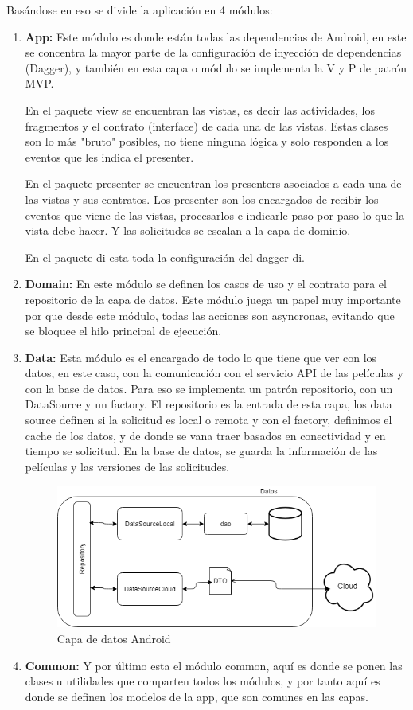 Basándose en eso se divide la aplicación en 4 módulos:
\begin{enumerate}

\item \textbf{ App:} Este módulo es donde están todas las dependencias de Android, en este se concentra la mayor parte de la configuración de inyección de dependencias (Dagger), y también en esta capa o módulo se implementa la V y P de patrón MVP.

En el paquete view se encuentran las vistas, es decir las actividades, los fragmentos y el contrato (interface) de cada una de las vistas. Estas clases son lo más "bruto" posibles, no tiene ninguna lógica y solo responden a los eventos que les indica el presenter.

En el paquete presenter se encuentran los presenters asociados a cada una de las vistas y sus contratos. Los presenter son los encargados de recibir los eventos que viene de las vistas, procesarlos e indicarle paso por paso lo que la vista debe hacer. Y las solicitudes se escalan a la capa de dominio.

En el paquete di esta toda la configuración del dagger di.
\item \textbf{ Domain:} En este módulo se definen los casos de uso y el contrato para el repositorio de la capa de datos. Este módulo juega un papel muy importante por que desde este módulo, todas las acciones son asyncronas, evitando que se bloquee el hilo principal de ejecución.
\item \textbf{ Data:} Esta módulo es el encargado de todo lo que tiene que ver con los datos, en este caso, con la comunicación con el servicio API de las películas y con la base de datos. Para eso se implementa un patrón repositorio, con un DataSource y un factory. El repositorio es la entrada de esta capa, los data source definen si la solicitud es local o remota y con el factory, definimos el cache de los datos, y de donde se vana traer basados en conectividad y en tiempo se solicitud. En la base de datos, se guarda la información de las películas y las versiones de las solicitudes.

\begin{figure}[h!]
 \centering
\includegraphics[width=0.7\linewidth]{Desarrollo/Arquitectura/imgs/iagram.png}
\caption{Capa de datos Android}
\end{figure}

\item \textbf{ Common:} Y por último esta el módulo common, aquí es donde se ponen las clases u utilidades que comparten todos los módulos, y por tanto aquí es donde se definen los modelos de la app, que son comunes en las capas.
\end{enumerate}


